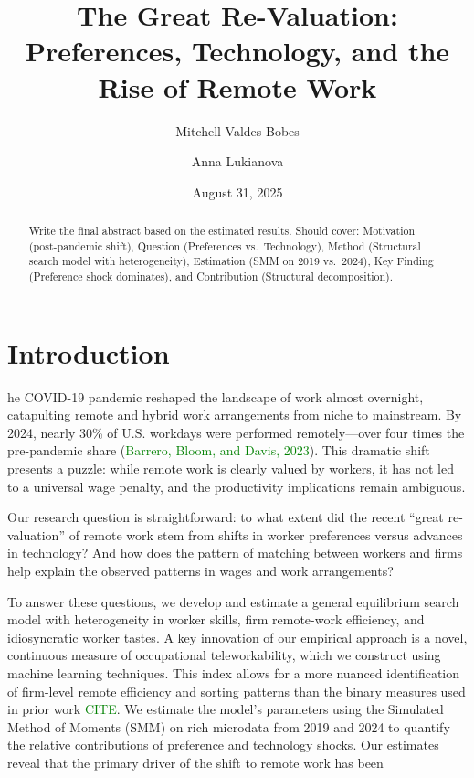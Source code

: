 \documentclass[
  11pt,
  letterpaper,
  DIV=11,
  numbers=noendperiod]{scrartcl}
\title{The Great Re-Valuation: Preferences, Technology, and the Rise of
Remote Work}
\author{Mitchell Valdes-Bobes \and Anna Lukianova}
\date{August 31, 2025}
\begin{document}
\maketitle
\begin{abstract}
Write the final abstract based on the estimated results. Should cover:
Motivation (post-pandemic shift), Question (Preferences vs.~Technology),
Method (Structural search model with heterogeneity), Estimation (SMM on
2019 vs.~2024), Key Finding (Preference shock dominates), and
Contribution (Structural decomposition).
\end{abstract}


\section{Introduction}\label{introduction}

he COVID-19 pandemic reshaped the landscape of work almost overnight,
catapulting remote and hybrid work arrangements from niche to
mainstream. By 2024, nearly 30\% of U.S. workdays were performed
remotely---over four times the pre-pandemic share
(\textcolor{green}{Barrero, Bloom, and Davis, 2023}). This dramatic
shift presents a puzzle: while remote work is clearly valued by workers,
it has not led to a universal wage penalty, and the productivity
implications remain ambiguous.

Our research question is straightforward: to what extent did the recent
``great re-valuation'' of remote work stem from shifts in worker
preferences versus advances in technology? And how does the pattern of
matching between workers and firms help explain the observed patterns in
wages and work arrangements?

To answer these questions, we develop and estimate a general equilibrium
search model with heterogeneity in worker skills, firm remote-work
efficiency, and idiosyncratic worker tastes. A key innovation of our
empirical approach is a novel, continuous measure of occupational
teleworkability, which we construct using machine learning techniques.
This index allows for a more nuanced identification of firm-level remote
efficiency and sorting patterns than the binary measures used in prior
work \textcolor{green}{CITE}. We estimate the model's parameters using
the Simulated Method of Moments (SMM) on rich microdata from 2019 and
2024 to quantify the relative contributions of preference and technology
shocks. Our estimates reveal that the primary driver of the shift to
remote work has been
\end{document}
